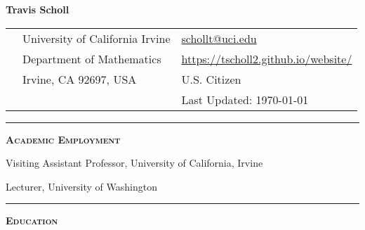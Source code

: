 \documentclass[12pt]{article}
\newcommand{\sectionheading}[1]
{
\bigskip %
\noindent
\hspace{-6.5mm}\textcolor{Gray}{\rule[.75mm]{21.5mm}{1mm}} %
\hspace{.2mm}	%
{\large{\textbf{\textsc{#1}}}} %
}
\newenvironment{date_section}
	{
	\vspace{-1ex}
	\leftmargini = 15ex
		\begin{itemize}[
			labelsep = *,
			labelwidth = 9ex,
			labelindent = 0ex,
			itemindent = !,
			font=\normalfont,
			align=parleft
		]{}
		\itemsep=-1.5mm
	}
	{\end{itemize}\vspace{-2ex}}
\newcommand{\yearrange}[2]{
	\item[
		{\makebox[1ex][r]{#1}}
		--
		{\makebox[1ex][l]{#2} }
		] }
\begin{document}

	\thispagestyle{empty}

	\centerline{{\LARGE \textbf{Travis Scholl}}}

	\vspace{3mm}

	\begin{center}
		\begin{tabular}[c]{lll} %
			\phantom{aaaaaaaaa} %
			& University of California Irvine
				& \url{schollt@uci.edu} \\
 			& Department of Mathematics
				& \url{https://tscholl2.github.io/website/}\\
 			& Irvine, CA 92697, USA
	 			& U.S. Citizen \\
			&
				& Last Updated: \today
		\end{tabular}
	\end{center}








	\sectionheading{Academic Employment}%

	\begin{date_section}
		\yearrange{2018}{(cur.)} Visiting Assistant Professor, University of California, Irvine %

		\yearrange{2018}{2018} Lecturer, University of Washington %

	\end{date_section}







	\sectionheading{Education}%
\end{document}
